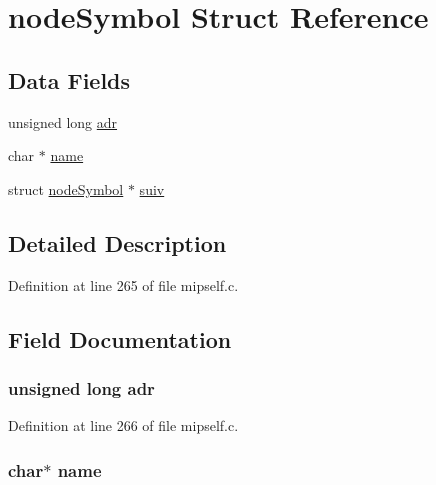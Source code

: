 \hypertarget{structnode_symbol}{\section{node\-Symbol \-Struct \-Reference}
\label{structnode_symbol}
}
\subsection*{\-Data \-Fields}
\begin{DoxyCompactItemize}
\item 
unsigned long \hyperlink{structnode_symbol_a8f4c3bb1e709a9fbfea922a956fc5cd1}{adr}
\item 
char $\ast$ \hyperlink{structnode_symbol_a5ac083a645d964373f022d03df4849c8}{name}
\item 
struct \hyperlink{structnode_symbol}{node\-Symbol} $\ast$ \hyperlink{structnode_symbol_a87372660f96867008855af85c4057b7c}{suiv}
\end{DoxyCompactItemize}


\subsection{\-Detailed \-Description}


\-Definition at line 265 of file mipself.\-c.



\subsection{\-Field \-Documentation}
\hypertarget{structnode_symbol_a8f4c3bb1e709a9fbfea922a956fc5cd1}{
\subsubsection[{adr}]{\setlength{\rightskip}{0pt plus 5cm}unsigned long {\bf adr}}}\label{structnode_symbol_a8f4c3bb1e709a9fbfea922a956fc5cd1}


\-Definition at line 266 of file mipself.\-c.

\hypertarget{structnode_symbol_a5ac083a645d964373f022d03df4849c8}{
\subsubsection[{name}]{\setlength{\rightskip}{0pt plus 5cm}char$\ast$ {\bf name}}}\label{structnode_symbol_a5ac083a645d964373f022d03df4849c8}


